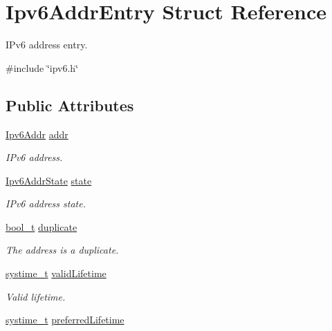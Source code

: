 \hypertarget{structIpv6AddrEntry}{}\section{Ipv6\+Addr\+Entry Struct Reference}
\label{structIpv6AddrEntry}


I\+Pv6 address entry.  




{\ttfamily \#include \char`\"{}ipv6.\+h\char`\"{}}

\subsection*{Public Attributes}
\begin{DoxyCompactItemize}
\item 
\hyperlink{ipv6_8h_aed0cbc40c61ed5b4fb681ebc55237e89}{Ipv6\+Addr} \hyperlink{structIpv6AddrEntry_a55b2d1238731a3b4ffca6928ebb52fe0}{addr}
\begin{DoxyCompactList}\small\item\em I\+Pv6 address. \end{DoxyCompactList}\item 
\hyperlink{ipv6_8h_acb54c5e2b7ee1652f5bf055e14cc518d}{Ipv6\+Addr\+State} \hyperlink{structIpv6AddrEntry_ae4ce939ceef8a1d15ac7d11542215a0f}{state}
\begin{DoxyCompactList}\small\item\em I\+Pv6 address state. \end{DoxyCompactList}\item 
\hyperlink{compiler__port_8h_a812d16e5494522586b3784e55d479912}{bool\+\_\+t} \hyperlink{structIpv6AddrEntry_aebcce0d3eff51b7c413e43ec5bf86282}{duplicate}
\begin{DoxyCompactList}\small\item\em The address is a duplicate. \end{DoxyCompactList}\item 
\hyperlink{compiler__port_8h_ae3e32a98d431a02106616da3071832dd}{systime\+\_\+t} \hyperlink{structIpv6AddrEntry_ab56a11d9de06327ab5af04e8ae18164d}{valid\+Lifetime}
\begin{DoxyCompactList}\small\item\em Valid lifetime. \end{DoxyCompactList}\item 
\hyperlink{compiler__port_8h_ae3e32a98d431a02106616da3071832dd}{systime\+\_\+t} \hyperlink{structIpv6AddrEntry_a4d368a125e163baf554e7622edff555f}{preferred\+Lifetime}

\end{DoxyCompactItemize}
